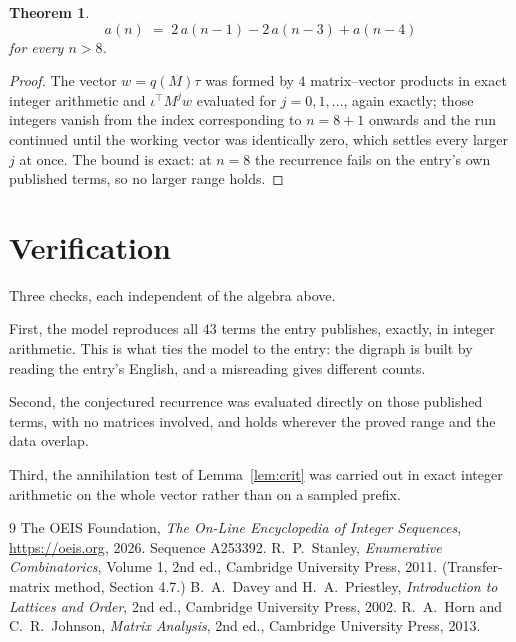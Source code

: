 \documentclass[11pt,a4paper]{article}
\theoremstyle{plain}
\newtheorem{theorem}{Theorem}
\theoremstyle{definition}
\begin{document}
\begin{theorem}
\[
a(n)\;=\;2\,a(n-1) - 2\,a(n-3) + a(n-4)
\]
for every $n>8$.
\end{theorem}

\begin{proof}
The vector $w=q(M)\tau$ was formed by $4$ matrix--vector products in exact integer
arithmetic and $\iota^{\!\top}M^{j}w$ evaluated for $j=0,1,\dots$, again exactly; those
integers vanish from the index corresponding to $n=8+1$ onwards and the run continued
until the working vector was identically zero, which settles every larger $j$ at once. The bound is exact: at $n=8$ the recurrence fails on the entry's own published terms, so no larger range holds.
\end{proof}

\section{Verification}

Three checks, each independent of the algebra above.

First, the model reproduces all $43$ terms the entry publishes, exactly, in integer
arithmetic. This is what ties the model to the entry: the digraph is built by reading the
entry's English, and a misreading gives different counts.

Second, the conjectured recurrence was evaluated directly on those published terms, with no
matrices involved, and holds wherever the proved range and the data overlap.

Third, the annihilation test of Lemma~\ref{lem:crit} was carried out in exact integer
arithmetic on the whole vector rather than on a sampled prefix.

\begin{thebibliography}{9}
 The OEIS Foundation, \emph{The On-Line Encyclopedia of Integer
Sequences}, \url{https://oeis.org}, 2026. Sequence A253392.
 R.~P.~Stanley, \emph{Enumerative Combinatorics}, Volume 1, 2nd ed.,
Cambridge University Press, 2011. (Transfer-matrix method, Section 4.7.)
 B.~A.~Davey and H.~A.~Priestley, \emph{Introduction to Lattices and
Order}, 2nd ed., Cambridge University Press, 2002.
 R.~A.~Horn and C.~R.~Johnson, \emph{Matrix Analysis}, 2nd ed., Cambridge
University Press, 2013.
\end{thebibliography}
\end{document}
